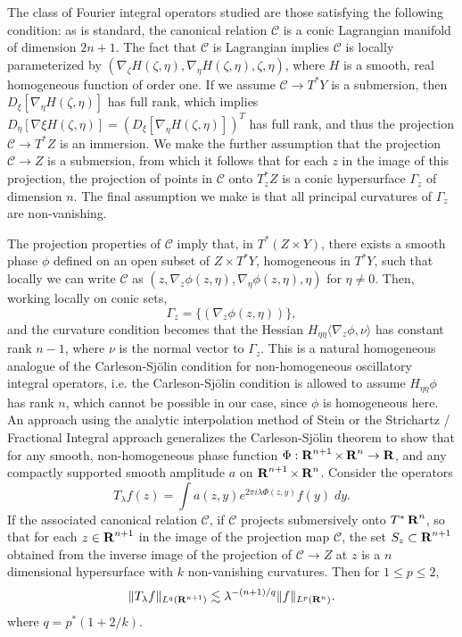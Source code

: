 The class of Fourier integral operators studied are those satisfying the following condition: as is standard, the canonical relation $\mathcal{C}$ is a conic Lagrangian manifold of dimension $2n + 1$. The fact that $\mathcal{C}$ is Lagrangian implies $\mathcal{C}$ is locally parameterized by $(\nabla_\zeta H(\zeta, \eta), \nabla_\eta H(\zeta, \eta),\zeta,\eta)$, where $H$ is a smooth, real homogeneous function of order one. If we assume $\mathcal{C} \to T^* Y$ is a submersion, then $D_\xi [\nabla_\eta H(\zeta,\eta)]$ has full rank, which implies $D_\eta [\nabla \xi H(\zeta, \eta)] = (D_\xi [\nabla_\eta H(\zeta, \eta)])^T$ has full rank, and thus the projection $\mathcal{C} \to T^* Z$ is an immersion. We make the further assumption that the projection $\mathcal{C} \to Z$ is a submersion, from which it follows that for each $z$ in the image of this projection, the projection of points in $\mathcal{C}$ onto $T^*_z Z$ is a conic hypersurface $\Gamma_z$ of dimension $n$. The final assumption we make is that all principal curvatures of $\Gamma_z$ are non-vanishing.

\begin{remark}
    The projection properties of $\mathcal{C}$ imply that, in $T^* (Z \times Y)$, there exists a smooth phase $\phi$ defined on an open subset of $Z \times T^* Y$, homogeneous in $T^* Y$, such that locally we can write $\mathcal{C}$ as $(z, \nabla_z \phi(z,\eta), \nabla_\eta \phi(z,\eta), \eta)$ for $\eta \neq 0$. Then, working locally on conic sets,
    \[ \Gamma_z = \{ (\nabla_z \phi(z,\eta)) \}, \]
    and the curvature condition becomes that the Hessian $H_{\eta \eta} \langle \nabla_z \phi, \nu \rangle$ has constant rank $n-1$, where $\nu$ is the normal vector to $\Gamma_z$. This is a natural homogeneous analogue of the Carleson-Sj\"{o}lin condition for non-homogeneous oscillatory integral operators, i.e. the Carleson-Sj\"{o}lin condition is allowed to assume $H_{\eta \eta} \phi$ has rank $n$, which cannot be possible in our case, since $\phi$ is homogeneous here. An approach using the analytic interpolation method of Stein or the Strichartz / Fractional Integral approach generalizes the Carleson-Sj\"{o}lin theorem to show that for any smooth, non-homogeneous phase function $\Phi: \operatorname{\mathbf{R}}^{n+1} \times \operatorname{\mathbf{R}}^n \to \operatorname{\mathbf{R}}$, and any compactly supported smooth amplitude $a$ on $\operatorname{\mathbf{R}}^{n+1} \times \operatorname{\mathbf{R}}^n$. Consider the operators
    \[ T_\lambda f(z) = \int a(z,y) e^{2 \pi i \lambda \Phi(z,y)} f(y)\; dy. \]
    If the associated canonical relation $\mathcal{C}$, if $\mathcal{C}$ projects submersively onto $T^* \operatorname{\mathbf{R}}^n$, so that for each $z \in \operatorname{\mathbf{R}}^{n+1}$ in the image of the projection map $\mathcal{C}$, the set $S_z \subset \operatorname{\mathbf{R}}^{n+1}$ obtained from the inverse image of the projection of $\mathcal{C} \to Z$ at $z$ is a $n$ dimensional hypersurface with $k$ non-vanishing curvatures. Then for $1 \leq p \leq 2$,
    \[ \| T_\lambda f \|_{L^q(\operatorname{\mathbf{R}}^{n+1})} \lesssim \lambda^{-(n+1)/q} \| f \|_{L^p(\operatorname{\mathbf{R}}^n)}. \]
    where $q = p^*(1 + 2/k)$.
\end{remark}

